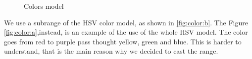 \documentclass[]{usiinfbachelorproject}
\begin{document}
 
\begin{figure}[h]
\centering
{}
\hspace*{\fill}

\caption{Colors model}
\label{fig:color}
\end{figure}

We use a subrange of the HSV color model, as shown in \ref{fig:color:b}.
The Figure \ref{fig:color:a},instead, is an example of the use of the whole HSV model. The color goes from red to purple pass thought yellow, green and blue. This is harder to understand, that is the main reason why we decided to cast the range.
\end{document}
